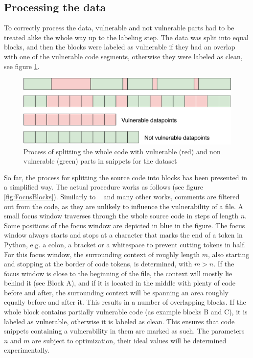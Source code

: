 \documentclass[
	a4paper,
	pagesize,
	pdftex,
	12pt,
	twoside, %
	BCOR=5mm, %
	ngerman,
	fleqn,
	final,
	]{scrartcl}
\begin{document}
\subsection{Processing the data}\label{Processing}
To correctly process the data, vulnerable and not vulnerable parts had to be treated alike the whole way up to the labeling step. The data was split into equal blocks, and then the blocks were labeled as vulnerable if they had an overlap with one of the vulnerable code segments, otherwise they were labeled as clean, see figure \ref{fig:collectData2}.

\begin{figure}[ht]
	\centering
	\includegraphics[width=\linewidth]{img/collectData2}
	\caption{Process of splitting the whole code with vulnerable (red) and non vulnerable (green) parts in snippets for the dataset}
	\label{fig:collectData2}
\end{figure}

So far, the process for splitting the source code into blocks has been presented in a simplified way. The actual procedure works as follows (see figure \ref{fig:FocusBlocks}).
Similarly to ~\cite{Hovsepyan.2012} and many other works, comments are filtered out from the code, as they are unlikely to influence the vulnerability of a file. A small focus window traverses through the whole source code in steps of length $n$. Some positions of the focus window are depicted in blue in the figure. The focus window always starts and stops at a character that marks the end of a token in Python, e.g. a colon, a bracket or a whitespace to prevent cutting tokens in half. For this focus window, the surrounding context of roughly length $m$, also starting and stopping at the border of code tokens, is determined, with $m > n$. If the focus window is close to the beginning of the file, the context will mostly lie behind it (see Block A), and if it is located in the middle with plenty of code before and after, the surrounding context will be spanning an area roughly equally before and after it. This results in a number of overlapping blocks. If the whole block contains partially vulnerable code (as example blocks B and C), it is labeled as vulnerable, otherwise it is labeled as clean. This ensures that code snippets containing a vulnerability in them are marked as such. The parameters $n$ and $m$ are subject to optimization, their ideal values will be determined experimentally.
\end{document}
